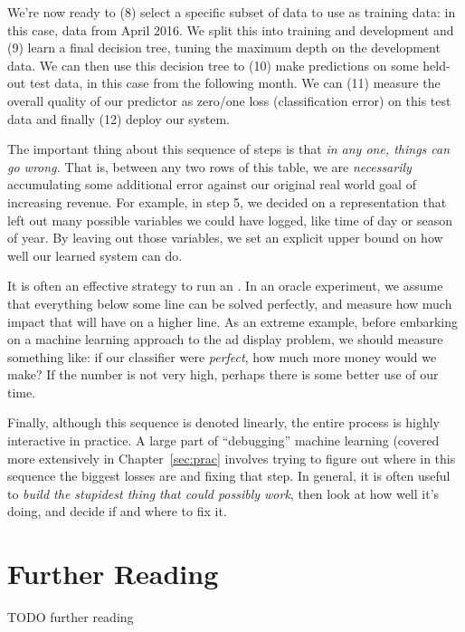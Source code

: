 We're now ready to (8) select a specific subset of data to use as training data: in this case, data from April 2016. We split this into training and development and (9) learn a final decision tree, tuning the maximum depth on the development data. We can then use this decision tree to (10) make predictions on some held-out test data, in this case from the following month. We can (11) measure the overall quality of our predictor as zero/one loss (classification error) on this test data and finally (12) deploy our system.

The important thing about this sequence of steps is that \emph{in any one, things can go wrong.} That is, between any two rows of this table, we are \emph{necessarily} accumulating some additional error against our original real world goal of increasing revenue. For example, in step 5, we decided on a representation that left out many possible variables we could have logged, like time of day or season of year. By leaving out those variables, we set an explicit upper bound on how well our learned system can do.

It is often an effective strategy to run an . In an oracle experiment, we assume that everything below some line can be solved perfectly, and measure how much impact that will have on a higher line. As an extreme example, before embarking on a machine learning approach to the ad display problem, we should measure something like: if our classifier were \emph{perfect}, how much more money would we make? If the number is not very high, perhaps there is some better use of our time.

Finally, although this sequence is denoted linearly, the entire process is highly interactive in practice. A large part of ``debugging'' machine learning (covered more extensively in Chapter~\ref{sec:prac} involves trying to figure out where in this sequence the biggest losses are and fixing that step. In general, it is often useful to \emph{build the stupidest thing that could possibly work}, then look at how well it's doing, and decide if and where to fix it.


\section{Further Reading}

TODO further reading


